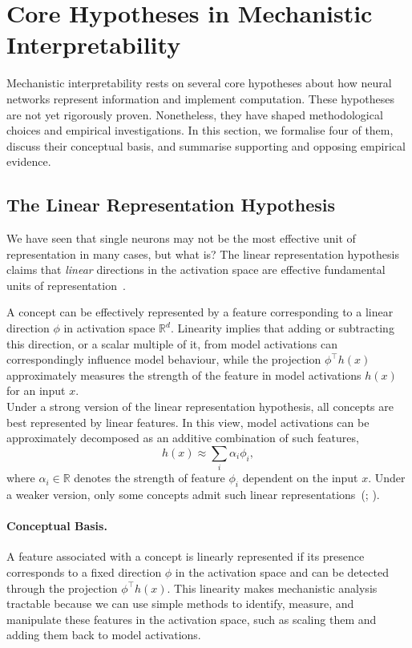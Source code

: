 \section{Core Hypotheses in Mechanistic Interpretability}
\label{sec:hypotheses}

Mechanistic interpretability rests on several core hypotheses about how neural networks represent information and implement computation. These hypotheses are not yet rigorously proven. Nonetheless, they have shaped methodological choices and empirical investigations. In this section, we formalise four of them, discuss their conceptual basis, and summarise supporting and opposing empirical evidence.

\subsection{The Linear Representation Hypothesis}
\label{subsec:linearity}

We have seen that single neurons may not be the most effective unit of representation in many cases, but what is? The linear representation hypothesis claims that \emph{linear} directions in the activation space are effective fundamental units of representation~.


\begin{definitionbox}
A concept can be effectively represented by a feature corresponding to a linear direction $\phi$ in activation space $\mathbb{R}^d$. Linearity implies that adding or subtracting this direction, or a scalar multiple of it, from model activations can correspondingly influence model behaviour, while the projection $\phi^\top h(x)$ approximately measures the strength of the feature in model activations $h(x)$ for an input $x$.\\

Under a strong version of the linear representation hypothesis, all concepts are best represented by linear features. In this view, model activations can be approximately decomposed as an additive combination of such features,
\[
h(x) \approx \sum_i \alpha_i \phi_i,
\]
where $\alpha_i \in \mathbb{R}$ denotes the strength of feature $\phi_i$ dependent on the input $x$. Under a weaker version, only some concepts admit such linear representations~(; ).
\end{definitionbox}

\paragraph{Conceptual Basis.} A feature associated with a concept is linearly represented if its presence corresponds to a fixed direction $\phi$ in the activation space and can be detected through the projection $\phi^\top h(x)$. This linearity makes mechanistic analysis tractable because we can use simple methods to identify, measure, and manipulate these features in the activation space, such as scaling them and adding them back to model activations.

